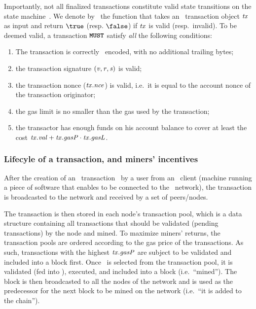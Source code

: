 Importantly, not all finalized transactions constitute valid state transitions on the state machine~\cite[Section 6]{ethyellowpaper}.
We denote by \ethVerifyTx~the function that takes an \ethereum~transaction object $\mathit{tx}$ as input and return $\true$ (resp. $\false$) if $\mathit{tx}$ is valid (resp.~invalid). To be deemed valid, a transaction $\textbf{\texttt{MUST}}$ satisfy \emph{all} the following conditions:
\begin{enumerate}
    \item The transaction is correctly \rlp~encoded, with no additional trailing bytes;
    \item the transaction signature $({\mathit{v}, \mathit{r}, \mathit{s}})$ is valid;
    \item the transaction nonce ($\mathit{tx}.\mathit{nce}$) is valid, i.e.~it is equal to the account nonce of the transaction originator;
    \item the gas limit is no smaller than the gas used by the transaction;
    \item the transactor has enough funds on his account balance to cover at least the cost $\mathit{tx}.\mathit{val} + \mathit{tx}.\mathit{gasP} \cdot \mathit{tx}.\mathit{gasL}$.
\end{enumerate}

\subsubsection{Lifecyle of a transaction, and miners' incentives}\label{preliminaries:ethereum:eth-tx:tx-life}

After the creation of an \ethereum~transaction \tx~by a user from an \ethereum~client (machine running a piece of software that enables to be connected to the \ethereum~network), the transaction is broadcasted to the network and received by a set of peers/nodes.

The transaction is then stored in each node's transaction pool, which is a data structure containing all transactions that should be validated (pending transactions) by the node and mined. To maximize miners' returns, the transaction pools are ordered according to the gas price of the transactions. As such, transactions with the highest $\mathit{tx}.\mathit{gasP}$ are subject to be validated and included into a block first.
Once \tx~is selected from the transaction pool, it is validated (fed into \ethVerifyTx), executed, and included into a block (i.e.~``mined''). The block is then broadcasted to all the nodes of the network and is used as the predecessor for the next block to be mined on the network (i.e.~``it is added to the chain'').

